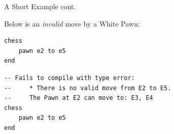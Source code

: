 \documentclass{beamer}
\begin{document}
\begin{frame}[fragile]{A Short Example cont.}

Below is an \emph{invalid} move by a White Pawn:

\begin{figure}[h]
    \centering
    \newgame
    \scalebox{0.55}{\showboard}
    \quad
    \scalebox{0.55}{\showboard}
    \label{badpawnmove}
\end{figure}

\pause

\begin{overprint}

\begin{lstlisting}
chess
    pawn e2 to e5
end
\end{lstlisting}

\begin{lstlisting}
-- Fails to compile with type error:
--     * There is no valid move from E2 to E5.
--     The Pawn at E2 can move to: E3, E4
chess
    pawn e2 to e5
end
\end{lstlisting}

\end{overprint}

\end{frame}
\end{document}

